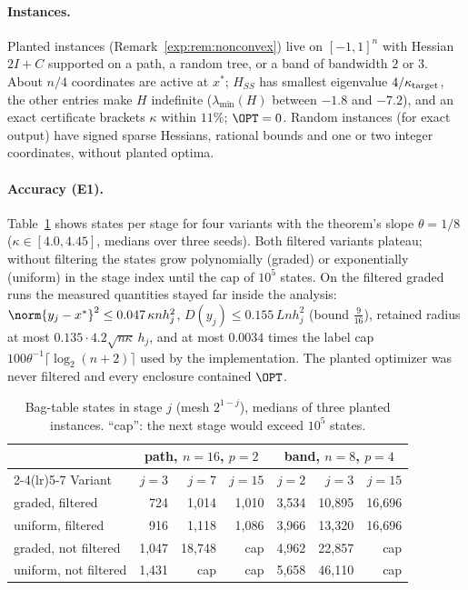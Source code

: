 \paragraph{Instances.} Planted instances (Remark~\ref{exp:rem:nonconvex})
live on $[-1,1]^n$ with Hessian $2I+C$ supported on a path, a random tree,
or a band of bandwidth $2$ or $3$. About $n/4$ coordinates are active at
$x^*$; $H_{SS}$ has smallest eigenvalue $4/\kappa_{\rm target}$, the other
entries make $H$ indefinite ($\lambda_{\min}(H)$ between $-1.8$ and $-7.2$),
and an exact certificate brackets $\kappa$ within $11\%$; $\OPT=0$. Random
instances (for exact output) have signed sparse Hessians, rational bounds
and one or two integer coordinates, without planted optima.

\paragraph{Accuracy (E1).} Table~\ref{exp:tab:e1} shows states per stage
for four variants with the theorem's slope $\theta=1/8$
($\kappa\in[4.0,4.45]$, medians over three seeds). Both filtered variants
plateau; without filtering the states grow polynomially (graded) or
exponentially (uniform) in the stage index until the cap of $10^5$
states. On the filtered graded runs the measured quantities stayed far
inside the analysis: $\norm{y_j-x^*}^2\le0.047\,\kappa nh_j^2$,
$D(y_j)\le0.155\,Lnh_j^2$ (bound $\frac9{16}$), retained radius at most
$0.135\cdot4.2\sqrt{n\kappa}\,h_j$, and at most $0.0034$ times the label
cap $100\theta^{-1}\lceil\log_2(n+2)\rceil$ used by the implementation. The planted optimizer was never
filtered and every enclosure contained $\OPT$.

\begin{table}[ht]\centering\small
\begin{tabular}{lrrrrrr}
\toprule
& \multicolumn{3}{c}{path, $n=16$, $p=2$} & \multicolumn{3}{c}{band, $n=8$, $p=4$}\\
\cmidrule(lr){2-4}\cmidrule(lr){5-7}
Variant & $j=3$ & $j=7$ & $j=15$ & $j=2$ & $j=3$ & $j=15$\\
\midrule
graded, filtered & 724 & 1{,}014 & 1{,}010 & 3{,}534 & 10{,}895 & 16{,}696\\
uniform, filtered & 916 & 1{,}118 & 1{,}086 & 3{,}966 & 13{,}320 & 16{,}696\\
graded, not filtered & 1{,}047 & 18{,}748 & cap & 4{,}962 & 22{,}857 & cap\\
uniform, not filtered & 1{,}431 & cap & cap & 5{,}658 & 46{,}110 & cap\\
\bottomrule
\end{tabular}
\caption{Bag-table states in stage $j$ (mesh $2^{1-j}$), medians of three
planted instances. ``cap'': the next stage would exceed $10^5$ states.}
\label{exp:tab:e1}
\end{table}

